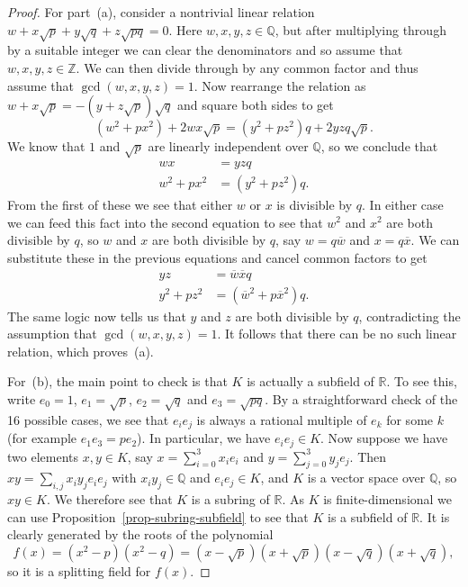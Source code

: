 \documentclass{amsart}
\newcommand{\Z}         {{\mathbb{Z}}}
\newcommand{\Q}         {{\mathbb{Q}}}
\newcommand{\R}         {{\mathbb{R}}}
\newcommand{\ov}[1]     {\overline{#1}}
\renewcommand{\:}{\colon}
\theoremstyle{definition}
\begin{document}
\begin{proof}
 For part~(a), consider a nontrivial linear relation
 $w+x\sqrt{p}+y\sqrt{q}+z\sqrt{pq}=0$.  Here $w,x,y,z\in\Q$, but after
 multiplying through by a suitable integer we can clear the
 denominators and so assume that $w,x,y,z\in\Z$.  We can then divide
 through by any common factor and thus assume that $\gcd(w,x,y,z)=1$.
 Now rearrange the relation as $w+x\sqrt{p}=-(y+z\sqrt{p})\sqrt{q}$ and
 square both sides to get 
 \[ (w^2+px^2)+2wx\sqrt{p} = (y^2+pz^2)q + 2yzq\sqrt{p}. \]
 We know that $1$ and $\sqrt{p}$ are linearly independent over $\Q$,
 so we conclude that 
 \begin{align*}
  wx &= yzq \\
  w^2+px^2 &= (y^2+pz^2)q.
 \end{align*}
 From the first of these we see that either $w$ or $x$ is divisible by
 $q$.  In either case we can feed this fact into the second equation
 to see that $w^2$ and $x^2$ are both divisible by $q$, so $w$ and $x$
 are both divisible by $q$, say $w=q\ov{w}$ and $x=q\ov{x}$.  We can
 substitute these in the previous equations and cancel common factors
 to get
 \begin{align*}
  yz &= \ov{w}\ov{x}q \\
  y^2+pz^2 &= (\ov{w}^2+p\ov{x}^2)q.
 \end{align*}
 The same logic now tells us that $y$ and $z$ are both divisible by
 $q$, contradicting the assumption that $\gcd(w,x,y,z)=1$.  It follows
 that there can be no such linear relation, which proves~(a).

 For~(b), the main point to check is that $K$ is actually a subfield
 of $\R$.  To see this, write $e_0=1$, $e_1=\sqrt{p}$, $e_2=\sqrt{q}$
 and $e_3=\sqrt{pq}$.  By a straightforward check of the 16 possible
 cases, we see that $e_ie_j$ is always a rational multiple of $e_k$
 for some $k$ (for example $e_1e_3=pe_2$).  In particular, we have
 $e_ie_j\in K$.  Now suppose we have two elements $x,y\in K$, say
 $x=\sum_{i=0}^3x_ie_i$ and $y=\sum_{j=0}^3y_je_j$.  Then
 $xy=\sum_{i,j}x_iy_je_ie_j$ with $x_iy_j\in\Q$ and $e_ie_j\in K$, and
 $K$ is a vector space over $\Q$, so $xy\in K$.  We therefore see that
 $K$ is a subring of $\R$.  As $K$ is finite-dimensional we can use
 Proposition~\ref{prop-subring-subfield} to see that $K$ is a subfield
 of $\R$.  It is clearly generated by the roots of the polynomial
 \[ f(x) = (x^2-p)(x^2-q) =
     (x-\sqrt{p})(x+\sqrt{p})(x-\sqrt{q})(x+\sqrt{q}),
 \]
 so it is a splitting field for $f(x)$.


\end{proof}
\end{document}
